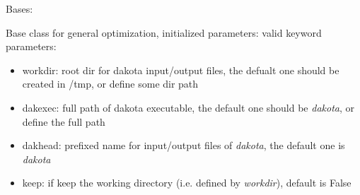 \documentclass[letterpaper,10pt,english]{sphinxmanual}
\begin{document}

\begin{fulllineitems}
\label{src/apidocs/genopt:genopt.DakotaBase}
Bases: \href{https://docs.python.org/2/library/functions.html\#object}{}

Base class for general optimization, initialized parameters:
valid keyword parameters:
\begin{itemize}
\item {} 
workdir: root dir for dakota input/output files,
the defualt one should be created in /tmp, or define some dir path

\item {} 
dakexec: full path of dakota executable,
the default one should be \emph{dakota}, or define the full path

\item {} 
dakhead: prefixed name for input/output files of \emph{dakota}, 
the default one is \emph{dakota}

\item {} 
keep: if keep the working directory (i.e. defined by \emph{workdir}), default is False

\end{itemize}

\begin{fulllineitems}
\label{src/apidocs/genopt:genopt.DakotaBase.dakexec}
\end{fulllineitems}


\begin{fulllineitems}
\label{src/apidocs/genopt:genopt.DakotaBase.dakhead}
\end{fulllineitems}


\begin{fulllineitems}
\label{src/apidocs/genopt:genopt.DakotaBase.keep}
\end{fulllineitems}


\begin{fulllineitems}
\label{src/apidocs/genopt:genopt.DakotaBase.workdir}
\end{fulllineitems}


\end{fulllineitems}
\end{document}
